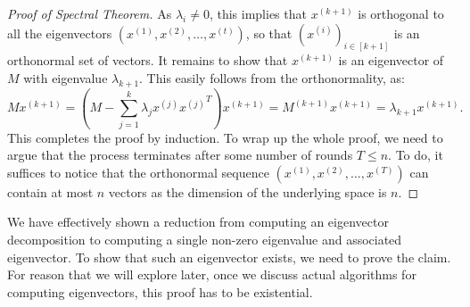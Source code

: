 \begin{proof}[Proof of Spectral Theorem]
As $\lambda_i \neq 0$, this implies that $x^{(k+1)}$ is orthogonal to all the eigenvectors $(x^{(1)}, x^{(2)}, \ldots, x^{(t)})$, so that $(x^{(i)})_{i \in [k+1]}$ is an orthonormal set of vectors. It remains to show that $x^{(k+1)}$ is an eigenvector of $M$ with eigenvalue $\lambda_{k+1}$. This easily follows from the orthonormality, as:
$$
M x^{(k+1)} = (M - \sum_{j=1}^k \lambda_j x^{(j)} {x^{(j)}}^T) x^{(k+1)} = M^{(k+1)} x^{(k+1)} = \lambda_{k+1} x^{(k+1)}.
$$
This completes the proof by induction. To wrap up the whole proof, we need to argue that the process terminates after some number of rounds $T \leq n.$ To do, it suffices to notice that the orthonormal sequence $(x^{(1)}, x^{(2)}, \ldots, x^{(T)})$ can contain at most $n$ vectors as the dimension of the underlying space is $n.$
\end{proof}

We have effectively shown a reduction from computing an eigenvector decomposition to computing a single non-zero eigenvalue and associated eigenvector. To show that such an eigenvector exists, we need to prove the claim. For reason that we will explore later, once we discuss actual algorithms for computing eigenvectors, this proof has to be existential.

